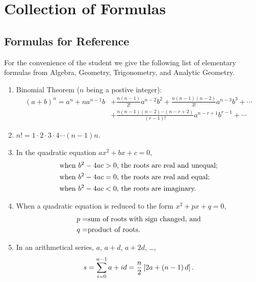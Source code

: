 \chapter{Collection of Formulas}
\label{ch:01-collection-of-formulas}

\section{Formulas for Reference}
\label{sec:1:1:formulas-for-reference}
For the convenience of the student we give the following list of elementary
formulas from Algebra, Geometry, Trigonometry, and Analytic Geometry.
\begin{enumerate}

\item
Binomial Theorem ($n$ being a postive integer):
\[
\begin{aligned}
\left(a + b\right)^n =
a^n + na^{n - 1}b &
+ \frac{n\left(n - 1\right)}{2!} a^{n - 2}b^2
+ \frac{n\left(n - 1\right)\left(n - 2\right)}{3!}a^{n - 3}b^3+\cdots\\ &
+ \frac{n\left(n - 1\right)\left(n - 2\right)\cdots
    \left(n - r + 2\right)}{\left(r - 1\right)!}a^{n - r + 1}b^{r - 1}
+\cdots
\end{aligned}
\]

\item
$n! = 1 \cdot 2 \cdot 3 \cdot 4 \cdots \left(n - 1\right)n$.

\item
In the quadratic equation $ax^2 + bx + c = 0$,
\[
\begin{aligned}
\textnormal{when }b^2 - 4ac & > 0\textnormal{, the roots are real and unequal;}\\
\textnormal{when }b^2 - 4ac & = 0\textnormal{, the roots are real and equal;}\\
\textnormal{when }b^2 - 4ac & < 0\textnormal{, the roots are imaginary.}
\end{aligned}
\]

\item
When a quadratic equation is reduced to the form $x^2 + px + q = 0$,
\[
\begin{aligned}
p= & \textnormal{sum of roots with sign changed, and}\\
q= & \textnormal{product of roots.}
\end{aligned}
\]

\item
In an arithmetical series, $a$, $a + d$, $a + 2d$, \ldots,
\[
s = \sum_{i = 0}^{n - 1} a + id
  = \frac{n}{2} \left[2a + \left(n - 1\right) d \right]
\textnormal{.}
\]


\end{enumerate}
